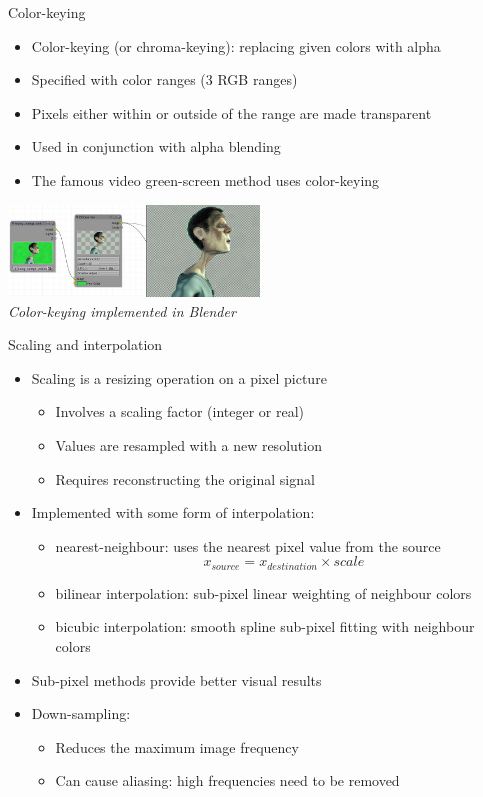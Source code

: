 \begin{frame}{Color-keying}
  \begin{itemize}
  \item Color-keying (or chroma-keying): replacing given colors with alpha
  \item Specified with color ranges (3 RGB ranges)
  \item Pixels either within or outside of the range are made transparent
  \item Used in conjunction with alpha blending
  \item The famous video green-screen method uses color-keying
  \end{itemize}
  \begin{center}
  \includegraphics[width=0.5\textwidth]{slides/graphics-theory/chroma-key-blender.jpg}\\
  \textit{\small Color-keying implemented in Blender}
  \end{center}
\end{frame}

\begin{frame}{Scaling and interpolation}
  \begin{itemize}
  \item Scaling is a resizing operation on a pixel picture
    \begin{itemize}
    \item Involves a scaling factor (integer or real)
    \item Values are resampled with a new resolution
    \item Requires reconstructing the original signal
    \end{itemize}
  \item Implemented with some form of interpolation:
    \begin{itemize}
    \item nearest-neighbour: uses the nearest pixel value from the source
\[
x_{source} = x_{destination} \times scale
\]
  \item bilinear interpolation: sub-pixel linear weighting of neighbour colors
  \item bicubic interpolation: smooth spline sub-pixel fitting with neighbour colors
    \end{itemize}
  \item Sub-pixel methods provide better visual results
  \item Down-sampling:
    \begin{itemize}
    \item Reduces the maximum image frequency
    \item Can cause aliasing: high frequencies need to be removed
    \end{itemize}
  \end{itemize}
\end{frame}


